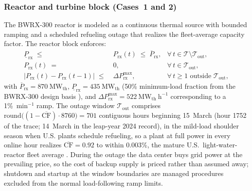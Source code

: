 \documentclass[a4paper,fleqn]{cas-sc}
\begin{document}
\subsubsection{Reactor and turbine block (Cases~1 and 2)}
The BWRX-300 reactor is modeled as a continuous thermal source with bounded ramping and a scheduled refueling outage that realizes the fleet-average capacity factor. The reactor block enforces:
\begin{align}
\underline{P}_\mathrm{rx} \;\le\; & P_\mathrm{rx}(t) \;\le\; \overline{P}_\mathrm{rx}, &\forall\, t \in \mathcal{T}\setminus\mathcal{T}_\mathrm{out}, \label{eq:rx_bounds}\\
P_\mathrm{rx}(t) \;=\; & 0, &\forall\, t \in \mathcal{T}_\mathrm{out}, \label{eq:rx_outage}\\
\big|P_\mathrm{rx}(t) - P_\mathrm{rx}(t-1)\big| \;\le\; & \Delta P_\mathrm{rx}^{\max}, &\forall\, t \ge 1 \text{ outside } \mathcal{T}_\mathrm{out}, \label{eq:rx_ramp}
\end{align}
with $\overline{P}_\mathrm{rx}=870~\mathrm{MW}_\mathrm{th}$, $\underline{P}_\mathrm{rx}=435~\mathrm{MW}_\mathrm{th}$ (50\% minimum-load fraction from the BWRX-300 design basis \citep{gehitachi2024bwrx300}), and $\Delta P_\mathrm{rx}^{\max}=522~\mathrm{MW}_\mathrm{th}~\mathrm{h}^{-1}$ corresponding to a 1\%~min$^{-1}$ ramp. The outage window $\mathcal{T}_\mathrm{out}$ comprises $\mathrm{round}\!\big((1-\overline{\mathrm{CF}})\cdot 8760\big) = 701$ contiguous hours beginning 15~March (hour 1752 of the trace; 14~March in the leap-year 2024 record), in the mild-load shoulder season when U.S. plants schedule refueling, so a plant at full power in every online hour realizes $\overline{\mathrm{CF}}=0.92$ to within 0.003\%, the mature U.S.\ light-water-reactor fleet average \citep{eia2025capacityfactors}. During the outage the data center buys grid power at the prevailing price, so the cost of backup supply is priced rather than assumed away; shutdown and startup at the window boundaries are managed procedures excluded from the normal load-following ramp limits.
\end{document}
